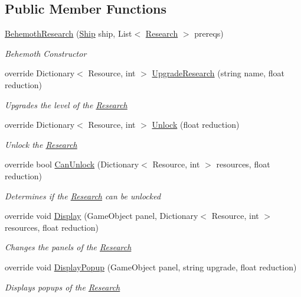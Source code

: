 \subsection*{Public Member Functions}
\begin{DoxyCompactItemize}
\item 
\hyperlink{class_behemoth_research_a9d1b5d80c07bcc4121fd1bc17e124d03}{Behemoth\+Research} (\hyperlink{class_ship}{Ship} ship, List$<$ \hyperlink{class_research}{Research} $>$ prereqs)
\begin{DoxyCompactList}\small\item\em Behemoth Constructor \end{DoxyCompactList}\item 
override Dictionary$<$ Resource, int $>$ \hyperlink{class_behemoth_research_a46f83061d749e4b6cc7d7704460c0f29}{Upgrade\+Research} (string name, float reduction)
\begin{DoxyCompactList}\small\item\em Upgrades the level of the \hyperlink{class_research}{Research} \end{DoxyCompactList}\item 
override Dictionary$<$ Resource, int $>$ \hyperlink{class_behemoth_research_ac0026673318671bec69fc5aeddd1c989}{Unlock} (float reduction)
\begin{DoxyCompactList}\small\item\em Unlock the \hyperlink{class_research}{Research} \end{DoxyCompactList}\item 
override bool \hyperlink{class_behemoth_research_ae2f40eec72e442430f9b222720935c28}{Can\+Unlock} (Dictionary$<$ Resource, int $>$ resources, float reduction)
\begin{DoxyCompactList}\small\item\em Determines if the \hyperlink{class_research}{Research} can be unlocked \end{DoxyCompactList}\item 
override void \hyperlink{class_behemoth_research_adb2765eedd2746e4f460e50f4f93dc8a}{Display} (Game\+Object panel, Dictionary$<$ Resource, int $>$ resources, float reduction)
\begin{DoxyCompactList}\small\item\em Changes the panels of the \hyperlink{class_research}{Research} \end{DoxyCompactList}\item 
override void \hyperlink{class_behemoth_research_aba2442416ed87cb23061f9e3c5ca382c}{Display\+Popup} (Game\+Object panel, string upgrade, float reduction)
\begin{DoxyCompactList}\small\item\em Displays popups of the \hyperlink{class_research}{Research} \end{DoxyCompactList}\end{DoxyCompactItemize}
